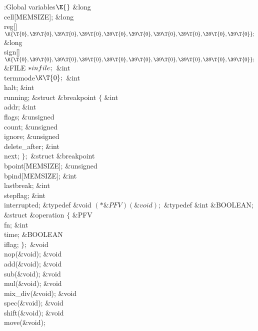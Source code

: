 \Y\B\4:Global variables\X${}\E{}$\6
\&{long} \\{cell}[\.{MEMSIZE}];\6
\&{long} \\{reg}[]${}\K\{\T{0},\39\T{0},\39\T{0},\39\T{0},\39\T{0},\39%
\T{0},\39\T{0},\39\T{0},\39\T{0},\39\T{0}\};{}$\6
\&{long} \\{sign}[]${}\K\{\T{0},\39\T{0},\39\T{0},\39\T{0},\39\T{0},\39%
\T{0},\39\T{0},\39\T{0},\39\T{0},\39\T{0}\};{}$\6
\&{FILE} ${}{*}\\{infile};{}$\6
\&{int} \\{termmode}${}\K\T{0};{}$\6
\&{int} \\{halt};\6
\&{int} \\{running};\6
\&{struct} \&{breakpoint} ${}\{{}$\1\6
\&{int} \\{addr};\6
\&{int} \\{flags};\6
\&{unsigned} \\{count};\6
\&{unsigned} \\{ignore};\6
\&{unsigned} \\{delete\_after};\6
\&{int} \\{next};\2\6
${}\};{}$\6
\&{struct} \&{breakpoint} \\{bpoint}[\.{MEMSIZE}];\6
\&{unsigned} \\{bpind}[\.{MEMSIZE}];\6
\&{int} \\{lastbreak};\6
\&{int} \\{stepflag};\6
\&{int} \\{interrupted};\6
\&{typedef} \&{void} ${}({*}\&{PFV})(\&{void});{}$\6
\&{typedef} \&{int} \&{BOOLEAN};\6
\&{struct} \&{operation} ${}\{{}$\1\6
\&{PFV} \\{fn};\6
\&{int} \\{time};\6
\&{BOOLEAN} \\{iflag};\2\6
${}\};{}$\6
\&{void} \\{nop}(\&{void});\6
\&{void} \\{add}(\&{void});\6
\&{void} \\{sub}(\&{void});\6
\&{void} \\{mul}(\&{void});\6
\&{void} \\{mix\_div}(\&{void});\6
\&{void} \\{spec}(\&{void});\6
\&{void} \\{shift}(\&{void});\6
\&{void} \\{move}(\&{void});\6
